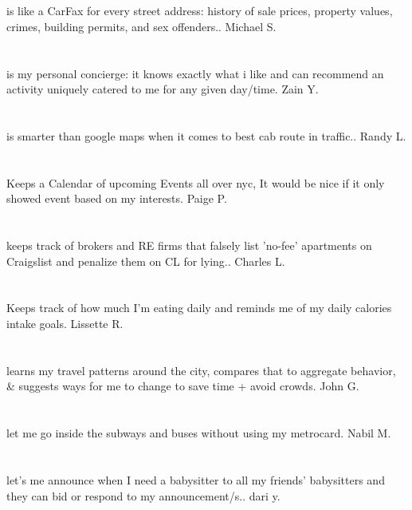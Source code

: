 \section{}is like a CarFax for every street address: history of sale prices,  property values,  crimes,  building permits,  and sex offenders.. Michael S.
\section{}is my personal concierge: it knows exactly what i like and can recommend an activity uniquely catered to me for any given day/time. Zain Y.
\section{}is smarter than google maps when it comes to best cab route in traffic.. Randy L.
\section{}Keeps a Calendar of upcoming Events all over nyc,  It would be nice if it only showed event based on my interests. Paige P.
\section{}keeps track of brokers and RE firms that falsely list 'no-fee' apartments on Craigslist and penalize them on CL for lying.. Charles L.
\section{}Keeps track of how much I'm eating daily and reminds me of my daily calories intake goals. Lissette R.
\section{}learns my travel patterns around the city,  compares that to aggregate behavior,  \& suggests ways for me to change to save time + avoid crowds. John G.
\section{}let me go inside the subways and buses without using my metrocard. Nabil M.
\section{}let's me announce when I need a babysitter to all my friends' babysitters and they can bid or respond to my announcement/s.. dari y.
